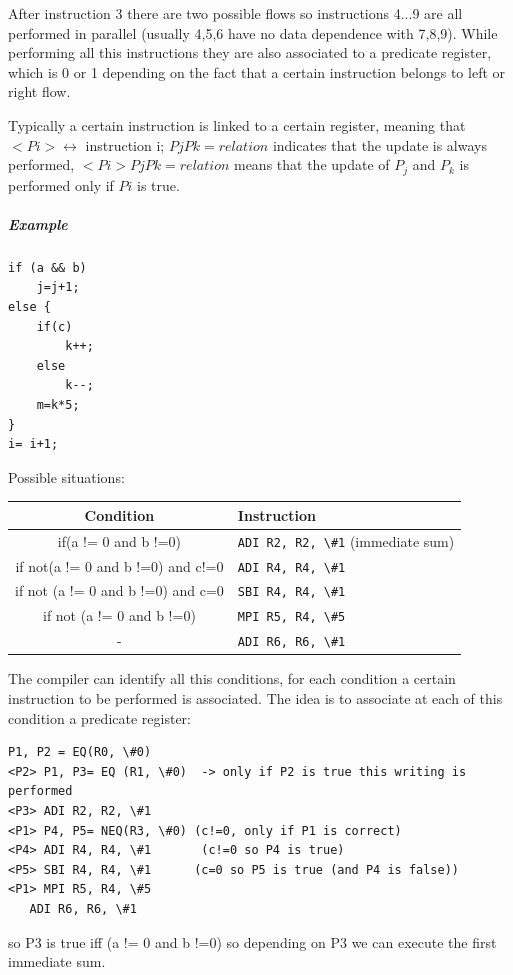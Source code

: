 After instruction 3 there are two possible flows so instructions 4...9 are all performed in parallel (usually 4,5,6 have no data dependence with 7,8,9). While performing all this instructions they are also associated to a predicate register, which is 0 or 1 depending on the fact that a certain instruction belongs to left or right flow.

Typically a certain instruction is linked to a certain register, meaning that $<Pi> \leftrightarrow $ instruction i; $Pj Pk = relation$ indicates that the update is always performed, $<Pi> Pj Pk =relation$ means that the update of $P_j$ and $P_k$ is performed only if $Pi$ is true.

\subparagraph{Example}

\begin{verbatim}
if (a && b)
    j=j+1;
else {
    if(c)
        k++;
    else
        k--;
    m=k*5;
}
i= i+1;
\end{verbatim}

Possible situations:

\begin{center}
  \begin{tabular}{|c|l|}
    \hline
    Condition& Instruction\\
    \hline
    if(a != 0 and b !=0)&         \verb|ADI R2, R2, \#1| (immediate sum)\\
    if not(a != 0 and b !=0) and c!=0&    \verb|ADI R4, R4, \#1|\\
    if not (a != 0 and b !=0) and c=0&    \verb|SBI R4, R4, \#1|\\
    if not (a != 0 and b !=0)&        \verb|MPI R5, R4, \#5|\\
    -&                    \verb|ADI R6, R6, \#1|\\
    \hline
  \end{tabular}
\end{center}

The compiler can identify all this conditions, for each condition a certain instruction to be performed is associated. The idea is to associate at each of this condition a predicate register:

\begin{verbatim}
P1, P2 = EQ(R0, \#0)
<P2> P1, P3= EQ (R1, \#0)  -> only if P2 is true this writing is performed
<P3> ADI R2, R2, \#1
<P1> P4, P5= NEQ(R3, \#0) (c!=0, only if P1 is correct)
<P4> ADI R4, R4, \#1       (c!=0 so P4 is true)
<P5> SBI R4, R4, \#1      (c=0 so P5 is true (and P4 is false))
<P1> MPI R5, R4, \#5
   ADI R6, R6, \#1
\end{verbatim}
so P3 is true iff (a != 0 and b !=0) so depending on P3 we can execute the first immediate sum.


